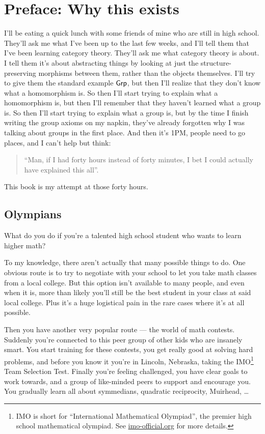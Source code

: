 \chapter*{Preface: Why this exists}
I'll be eating a quick lunch with some friends of mine who are still in high school.
They'll ask me what I've been up to the last few weeks,
and I'll tell them that I've been learning category theory.
They'll ask me what category theory is about.
I tell them it's about abstracting things by looking at just the
structure-preserving morphisms between them, rather than the objects themselves.
I'll try to give them the standard example $\mathsf{Grp}$,
but then I'll realize that they don't know what a homomorphism is.
So then I'll start trying to explain what a homomorphism is,
but then I'll remember that they haven't learned what a group is.
So then I'll start trying to explain what a group is,
but by the time I finish writing the group axioms on my napkin,
they've already forgotten why I was talking about groups in the first place.
And then it's 1PM, people need to go places, and I can't help but think:
\begin{quote}
	``Man, if I had forty hours instead of forty minutes, I bet I could actually have explained this all''.
\end{quote}
This book is my attempt at those forty hours.

\section*{Olympians}
What do you do if you're a talented high school student
who wants to learn higher math?

To my knowledge, there aren't actually that many possible things to do.
One obvious route is to try to negotiate with your school to
let you take math classes from a local college.
But this option isn't available to many people,
and even when it is, more than likely you'll still be the
best student in your class at said local college.
Plus it's a huge logistical pain in the rare cases where it's at all possible.

Then you have another very popular route --- the world of math contests.
Suddenly you're connected to this peer group of other kids who are insanely smart.
You start training for these contests,
you get really good at solving hard problems,
and before you know it you're in Lincoln, Nebraska, taking the
IMO\footnote{IMO is short for ``International Mathematical Olympiad'',
	the premier high school mathematical olympiad.
	See \url{imo-official.org} for more details.} Team Selection Test.
Finally you're feeling challenged, you have clear goals to work towards,
and a group of like-minded peers to support and encourage you.
You gradually learn all about symmedians, quadratic reciprocity, Muirhead, \dots

